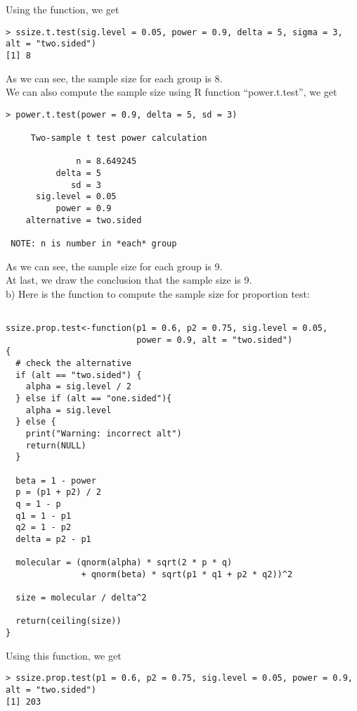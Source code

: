 \documentclass[12pt]{article}
\begin{document}
Using the function, we get

\begin{verbatim}
> ssize.t.test(sig.level = 0.05, power = 0.9, delta = 5, sigma = 3,
alt = "two.sided")
[1] 8
\end{verbatim}

As we can see, the sample size for each group is 8. \\

We can also compute the sample size using R function ``power.t.test'',
we get

\begin{verbatim}
> power.t.test(power = 0.9, delta = 5, sd = 3)

     Two-sample t test power calculation 

              n = 8.649245
          delta = 5
             sd = 3
      sig.level = 0.05
          power = 0.9
    alternative = two.sided

 NOTE: n is number in *each* group 
\end{verbatim}

As we can see, the sample size for each group is 9. \\

At last, we draw the conclusion that the sample size is 9.\\

b) Here is the function to compute the sample size for proportion
test:

\begin{verbatim}

ssize.prop.test<-function(p1 = 0.6, p2 = 0.75, sig.level = 0.05,
                          power = 0.9, alt = "two.sided") 
{
  # check the alternative
  if (alt == "two.sided") {
    alpha = sig.level / 2 
  } else if (alt == "one.sided"){
    alpha = sig.level
  } else {
    print("Warning: incorrect alt")
    return(NULL)
  }

  beta = 1 - power
  p = (p1 + p2) / 2
  q = 1 - p
  q1 = 1 - p1
  q2 = 1 - p2
  delta = p2 - p1

  molecular = (qnorm(alpha) * sqrt(2 * p * q)
               + qnorm(beta) * sqrt(p1 * q1 + p2 * q2))^2 
  
  size = molecular / delta^2

  return(ceiling(size))  
}
\end{verbatim}

Using this function, we get

\begin{verbatim}
> ssize.prop.test(p1 = 0.6, p2 = 0.75, sig.level = 0.05, power = 0.9,
alt = "two.sided")
[1] 203
\end{verbatim}
\end{document}
